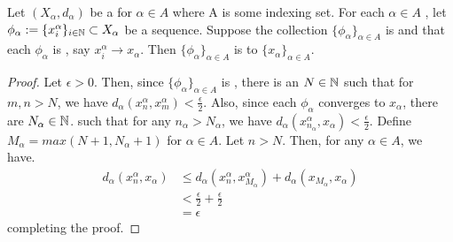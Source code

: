 \label{prop:uniformlycauchyplusconvergenceimpliesuniformconvergence}
\begin{prop}

	Let $(X_\alpha, d_\alpha)$ be a \PseudometricSpace
	for $\alpha \in A$ where A is some indexing set. 
	For each $\alpha \in A$
	, let $\phi_\alpha :=\{x_i^\alpha\}_{i \in \mathbb{N}} \subset X_{\alpha}$
	be a sequence. 
    Suppose the collection $\{\phi_\alpha\}_{\alpha \in A}$ 
    is \UniformlyCauchy
    and that each $\phi_\alpha$ 
    is \PseudometricConvergent
    , say $x_i^{\alpha} \to x_\alpha$. 
    Then $\{\phi_\alpha\}_{\alpha \in A}$
    is \UniformlyConvergent
    to $\{x_\alpha\}_{\alpha \in A}$. 
    \begin{proof}
        Let $\epsilon > 0$. 
        Then, since $\{\phi_\alpha\}_{\alpha \in A}$ 
        is \UniformlyCauchy, 
        there is an 
        $N \in \mathbb{N}$
        such that 
        for $m, n>N$, we have
        $d_{\alpha}(x^{\alpha}_n,x^{\alpha}_m) < \frac{\epsilon}{2}$. 
        Also, since each $\phi_\alpha$ converges to $x_\alpha$, 
        there are $N_{\alpha} \in \mathbb{N}$. 
        such that for any $n_\alpha > N_\alpha$, 
        we have
        $d_\alpha(x^{\alpha}_{n_\alpha}, x_\alpha) < \frac{\epsilon }{2}$. 
        Define $M_{\alpha}=max(N+1, N_{\alpha}+1)$ for $\alpha \in A$. 
        Let $n>N$. 
        Then, for any $\alpha \in A$, we have. 
        \begin{align*}
            d_{\alpha}(x_n^{\alpha} , x_\alpha) & \leq d_{\alpha}(x_n^{\alpha} , x^{\alpha}_{M_{\alpha}}) + d_{\alpha}(x_{M_{\alpha}}, x_\alpha)\\
            & < \frac{\epsilon}{2}+\frac{\epsilon}{2} \\
            & = \epsilon
        \end{align*}
        completing the proof. 



    \end{proof} 
\end{prop}

